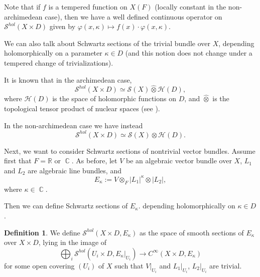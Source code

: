 \documentclass[12pt,reqno]{amsart}
\DeclareMathOperator\C{\mathbb C}
\theoremstyle{definition}
\newtheorem{definition}[theorem]{Definition}
\theoremstyle{remark}
\numberwithin{equation}{section}
\newcommand{\ot}{\otimes}
\renewcommand{\SS}{{\mathcal S}}
\newcommand{\HH}{{\mathcal H}}
\newcommand{\R}{{\mathbb R}}
\begin{document}
Note that if $f$ is a tempered function on $X(F)$ (locally constant in the non-archimedean case), then we have a well defined continuous operator on $\SS^{hol}(X\times D)$ given by 
$\varphi(x,\kappa)\mapsto f(x)\cdot\varphi(x,\kappa)$.

We can also talk about Schwartz sections of the trivial bundle over $X$, depending holomorphically on a parameter $\kappa\in D$
(and this notion does not change under a tempered
change of trivializations).


It is known that in the archimedean case,
\begin{equation}\label{tensor-product-eq}
\SS^{hol}(X\times D)\simeq \SS(X)\hat{\otimes} \HH(D),
\end{equation}
where $\HH(D)$ is the space of holomorphic functions on $D$, and $\hat{\otimes}$ is the topological tensor product of nuclear spaces
(see \cite[ch.II,\S 3, n.3, Ex.2,3]{Groth}).

In the non-archimedean case we have instead
$$\SS^{hol}(X\times D)\simeq \SS(X)\otimes \HH(D).$$


Next, we want to consider Schwartz sections of nontrivial vector bundles. Assume first that $F=\R$ or $\C$.
As before, let $V$ be an algebraic vector bundle over $X$, 
$L_1$ and $L_2$ are algebraic line bundles, and
$$E_{\kappa}:=V\ot_F |L_1|^{\kappa}\ot |L_2|,$$
where $\kappa\in \C$.

Then we can define Schwartz sections of $E_{\kappa}$. 
depending holomorphically on $\kappa\in D$.



\begin{definition}\label{Sch-hol-vec-bun-def} 
We define $\SS^{hol}(X\times D,E_{\kappa})$ as the space of smooth sections of $E_{\kappa}$ over $X\times D$, 
lying in the image of 
$$\bigoplus_i \SS^{hol}(U_i\times D,E_{\kappa}|_{U_i})\to C^\infty(X\times D,E_{\kappa})$$
for some open covering $(U_i)$ of $X$ such that $V|_{U_i}$ and $L_1|_{U_i}$, $L_2|_{U_i}$ are trivial.
\end{definition}
\end{document}
